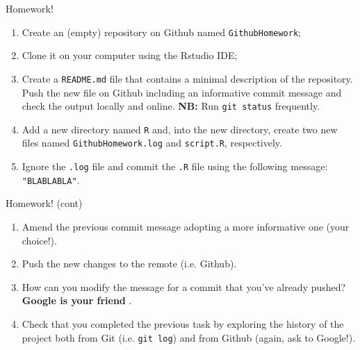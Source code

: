 \documentclass[
hyperref={bookmarks=false},
xcolor={dvipsnames,svgnames*,x11names*}, 
12pt
]{beamer}
\begin{document}
\begin{frame}{Homework!}
\vspace{-0.5cm}
\begin{enumerate}
\itemsep 1ex
\item Create an (empty) repository on Github named \texttt{GithubHomework}; 
\item Clone it on your computer using the Rstudio IDE; 
\item Create a \texttt{README.md} file that contains a minimal description of the repository. Push the new file on Github including an informative commit message and check the output locally and online. \textbf{NB:} Run \texttt{git status} frequently.  
\item Add a new directory named \texttt{R} and, into the new directory, create two new files named \texttt{GithubHomework.log} and \texttt{script.R}, respectively. 
\item Ignore the \texttt{.log} file and commit the \texttt{.R} file using the following message: \texttt{"BLABLABLA"}.
\setcounter{myenumi}{\value{enumi}}
\end{enumerate}
\end{frame}

\begin{frame}{Homework! (cont)}
\vspace{-0.5cm}
\begin{enumerate}
\setcounter{enumi}{\value{myenumi}}
\item Amend the previous commit message adopting a more informative one (your choice!). 
\item Push the new changes to the remote (i.e. Github). 
\item How can you modify the message for a commit that you've already pushed? \textbf{Google is your friend} . 
\item Check that you completed the previous task by exploring the history of the project both from Git (i.e. \texttt{git log}) and from Github (again, ask to Google!). 
\end{enumerate}
\end{frame}
\end{document}
